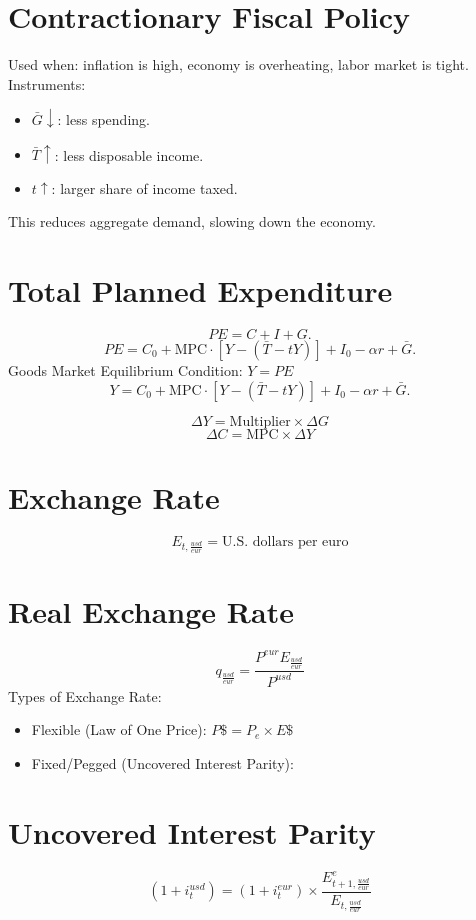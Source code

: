 \documentclass[a4paper, 11pt]{article}
\begin{document}
\section{Contractionary Fiscal Policy}
Used when: inflation is high, economy is overheating, labor market is tight.
Instruments:
\begin{itemize}
    \item $\bar{G}\downarrow$: less spending.
    \item $\bar{T}\uparrow$: less disposable income.
    \item $t\uparrow$: larger share of income taxed.
\end{itemize}
This reduces aggregate demand, slowing down the economy.

\section{Total Planned Expenditure}
\[
PE = C + I + G.
\]
\[
PE = C_0 + \text{MPC}\cdot [Y - (\bar{T} - tY)] + I_0 - \alpha r + \bar{G}.
\]
Goods Market Equilibrium Condition: $Y=PE$
\[
Y = C_0 + \text{MPC}\cdot [Y - (\bar{T} - tY)] + I_0 - \alpha r + \bar{G}.
\]

\[
\Delta Y = \text{Multiplier} \times \Delta G
\]
\[
\Delta C = \text{MPC} \times \Delta Y
\]

\section{Exchange Rate}
\[
E_{t,\frac{usd}{eur}} = \text{U.S. dollars per euro}
\]

\section{Real Exchange Rate}
\[
q_{\frac{usd}{eur}} = \frac{P^{eur}E_{\frac{usd}{eur}}}{P^{usd}}
\]
Types of Exchange Rate:
\begin{itemize}
    \item Flexible (Law of One Price): $P\$ = P_e \times E\$$
    \item Fixed/Pegged (Uncovered Interest Parity):
\end{itemize}

\section{Uncovered Interest Parity}
\[
(1+i_t^{usd}) = (1+i_t^{eur}) \times \frac{E_{t+1,\frac{usd}{eur}}^e}{E_{t,\frac{usd}{eur}}}
\]
\end{document}
